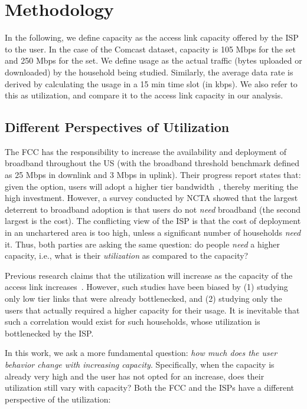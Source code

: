 \section{Methodology}
\label{sec:methodology}

In the following, we define capacity as the access link capacity offered by the 
ISP to the user. In the case of the Comcast dataset, capacity is 105 Mbps for 
the \control set and 250 Mbps for the \test set. We define usage as 
the actual traffic (bytes uploaded or downloaded) by the household being 
studied. Similarly, the average data rate is derived by calculating the 
usage in a 15 min time slot (in kbps). We also refer to this as utilization,
and compare it to the access link capacity in our analysis.

\subsection{Different Perspectives of Utilization}

The FCC has the responsibility to increase the availability and deployment of broadband
throughout the US (with the broadband threshold benchmark defined as 25 Mbps in downlink and
3 Mbps in uplink). Their progress report states that: given the option, users will adopt a
higher tier bandwidth~\cite{}, thereby meriting the high investment. However, a survey
conducted by NCTA showed that the largest deterrent to broadband adoption is that users
do not \emph{need} broadband (the second largest is the cost). The conflicting view of 
the ISP is that the cost of deployment in an unchartered area is too high, unless
a significant number of households \emph{need} it. Thus, both parties are asking the same
question: do people \emph{need} a higher capacity, i.e., what is their \emph{utilization}
as compared to the capacity?

Previous research claims that the utilization will increase as the capacity of the access
link increases~\cite{dasu, ?}. However, such studies have been biased by (1) studying only low tier
links that were already bottlenecked, and (2) studying only the users that actually required a
higher capacity for their usage. It is inevitable that such a correlation would exist for 
such households, whose utilization is bottlenecked by the ISP.

In this work, we ask a more fundamental question: \emph{how much does the user behavior
change with increasing capacity}. Specifically, when the capacity is already very high
and the user has not opted for an increase, does their utilization still vary with capacity?
Both the FCC and the ISPs have a different perspective of the utilization:

